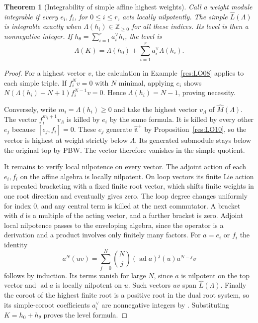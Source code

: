 \documentclass[11pt,oneside,openany]{book}
\newtheorem{theorem}{Theorem}[chapter]
\theoremstyle{definition}
\theoremstyle{remark}
\begin{document}
\begin{theorem}[Integrability of simple affine highest weights]
\label{res:LO12}
Call a weight module integrable if every \(e_i,f_i\), for
\(0\le i\le r\), acts locally nilpotently. The simple
\(\widehat L(\Lambda)\) is integrable exactly when
\(\Lambda(h_i)\in\mathbb Z_{\ge0}\) for all these indices.
Its level is then a nonnegative integer. If
\(h_\theta=\sum_{i=1}^{r}a_i^\vee h_i\), the level is
\[
   \Lambda(K)=\Lambda(h_0)+
      \sum_{i=1}^{r}a_i^\vee\Lambda(h_i) .
\]
\end{theorem}
\begin{proof}
For a highest vector \(v\), the calculation in
Example~\ref{res:LO08} applies to each simple triple.
If \(f_i^N v=0\) with \(N\) minimal, applying \(e_i\)
shows \(N(\Lambda(h_i)-N+1) f_i^{N-1}v=0\).
Hence \(\Lambda(h_i)=N-1\), proving necessity.

Conversely, write \(m_i=\Lambda(h_i)\ge0\) and take the highest vector
\(v_\Lambda\) of \(\widehat M(\Lambda)\). The vector
\(f_i^{m_i+1}v_\Lambda\) is killed by \(e_i\)
by the same formula. It is killed by every other \(e_j\)
because \([e_j,f_i]=0\). These \(e_j\) generate
\(\widehat{\mathfrak n}^+\) by Proposition~\ref{res:LO10},
so the vector is highest at weight strictly below
\(\Lambda\). Its generated submodule stays below the original
top by PBW. The vector therefore vanishes in the simple
quotient.

It remains to verify local nilpotence on every vector.
The adjoint action of each \(e_i,f_i\) on the affine algebra
is locally nilpotent. On loop vectors its finite Lie action
is repeated bracketing with a fixed finite root vector,
which shifts finite weights in one root direction and
eventually gives zero. The loop degree changes uniformly
for index \(0\), and any central term is killed at the
next commutator. A bracket with \(d\) is a multiple
of the acting vector, and a further bracket is zero.
Adjoint local nilpotence passes to the enveloping algebra,
since the operator is a derivation and a product involves
only finitely many factors. For \(a=e_i\) or \(f_i\) the identity
\[
   a^N(uv)=
   \sum_{j=0}^N {N\choose j}(\operatorname{ad}a)^j(u)a^{N-j}v
\]
follows by induction. Its terms vanish for large \(N\),
since \(a\) is nilpotent on the top vector and
\(\operatorname{ad}a\) is locally nilpotent on \(u\).
Such vectors \(uv\) span \(\widehat L(\Lambda)\).
Finally the coroot of the highest finite root is a positive root
in the dual root system, so its simple-coroot coefficients \(a_i^\vee\)
are nonnegative integers by
\cite[Results E02 and E07, PDF pp.~29, 33--34]{mg-lie}.
Substituting \(K=h_0+h_\theta\) proves the level formula.
\end{proof}
\end{document}

